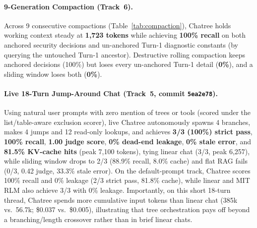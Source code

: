 \documentclass[10pt,twocolumn]{article}
\begin{document}
\paragraph{9-Generation Compaction (Track~6).}
Across 9 consecutive compactions (Table~\ref{tab:compaction}), Chatree holds working context steady at \textbf{1,723 tokens} while achieving \textbf{100\% recall} on both anchored security decisions and un-anchored Turn-1 diagnostic constants (by querying the untouched Turn-1 ancestor). Destructive rolling compaction keeps anchored decisions (100\%) but loses every un-anchored Turn-1 detail (\textbf{0\%}), and a sliding window loses both (\textbf{0\%}).

\begin{table}[t]
\centering
\caption{9-generation live compaction benchmark (\texttt{deepseek-chat}).}
\label{tab:compaction}
\scriptsize
\setlength{\tabcolsep}{3.0pt}
\end{table}

\paragraph{Live 18-Turn Jump-Around Chat (Track~5, commit \texttt{5ea2e78}).}
Using natural user prompts with zero mention of trees or tools (scored under the list/table-aware exclusion scorer), live Chatree autonomously spawns 4 branches, makes 4 jumps and 12 read-only lookups, and achieves \textbf{3/3 (100\%) strict pass}, \textbf{100\% recall}, \textbf{1.00 judge score}, \textbf{0\% dead-end leakage}, \textbf{0\% stale error}, and \textbf{81.5\% KV-cache hits} (peak 7,100 tokens), tying linear chat (3/3, peak 6,257), while sliding window drops to 2/3 (88.9\% recall, 8.0\% cache) and flat RAG fails (0/3, 0.42 judge, 33.3\% stale error). On the default-prompt track, Chatree scores 100\% recall and 0\% leakage (2/3 strict pass, 81.8\% cache), while linear and MIT RLM also achieve 3/3 with 0\% leakage. Importantly, on this short 18-turn thread, Chatree spends more cumulative input tokens than linear chat (385k vs.\ 56.7k; \$0.037 vs.\ \$0.005), illustrating that tree orchestration pays off beyond a branching/length crossover rather than in brief linear chats.
\end{document}
